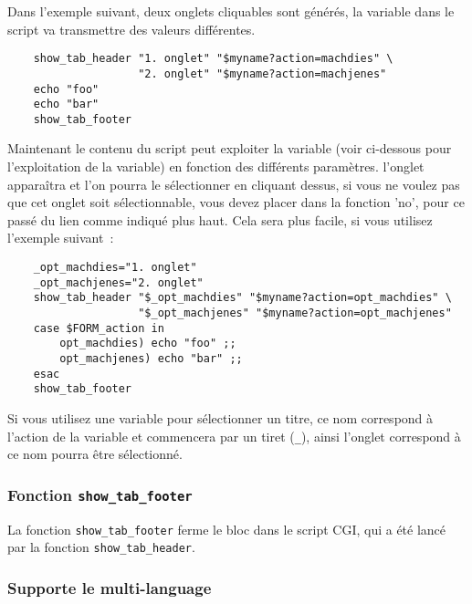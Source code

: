 Dans l'exemple suivant, deux onglets cliquables sont générés, la variable
 dans le script va transmettre des valeurs différentes.

\begin{example}
\begin{verbatim}
    show_tab_header "1. onglet" "$myname?action=machdies" \
                    "2. onglet" "$myname?action=machjenes"
    echo "foo"
    echo "bar"
    show_tab_footer
\end{verbatim}
\end{example}

Maintenant le contenu du script peut exploiter la variable  (voir
ci-dessous pour l’exploitation de la variable) en fonction des différents
paramètres. l'onglet apparaîtra et l’on pourra le sélectionner en cliquant
dessus, si vous ne voulez pas que cet onglet soit sélectionnable, vous devez
placer dans la fonction 'no', pour ce passé du lien comme indiqué plus haut.
Cela sera plus facile, si vous utilisez l'exemple suivant~:

\begin{example}
\begin{verbatim}
    _opt_machdies="1. onglet"
    _opt_machjenes="2. onglet"
    show_tab_header "$_opt_machdies" "$myname?action=opt_machdies" \
                    "$_opt_machjenes" "$myname?action=opt_machjenes"
    case $FORM_action in
        opt_machdies) echo "foo" ;;
        opt_machjenes) echo "bar" ;;
    esac
    show_tab_footer
\end{verbatim}
\end{example}

Si vous utilisez une variable pour sélectionner un titre, ce nom correspond à
l’action de la variable et commencera par un tiret (\texttt{\_}), ainsi l'onglet
correspond à ce nom pourra être sélectionné.


\subsubsection{Fonction \texttt{show\_tab\_footer}}

La fonction \texttt{show\_tab\_footer} ferme le bloc dans le script CGI, qui a été lancé par
la fonction \texttt{show\_tab\_header}.


\subsubsection{Supporte le multi-language}

